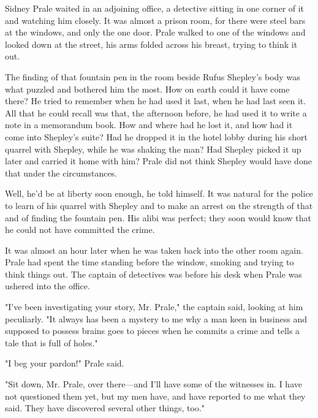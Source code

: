 \documentclass{novel}
\begin{document}
\vspace{2\nbs}
\clearpage
\thispagestyle{empty}

\begin{ChapterStart}
\vspace{3\nbs}
\end{ChapterStart}
    
Sidney Prale waited in an adjoining office, a detective sitting in one corner of it and watching him closely. It was almost a prison room, for there were steel bars at the windows, and only the one door. Prale walked to one of the windows and looked down at the street, his arms folded across his breast, trying to think it out.

The finding of that fountain pen in the room beside Rufus Shepley's body was what puzzled and bothered him the most. How on earth could it have come there? He tried to remember when he had used it last, when he had last seen it. All that he could recall was that, the afternoon before, he had used it to write a note in a memorandum book. How and where had he lost it, and how had it come into Shepley's suite? Had he dropped it in the hotel lobby during his short quarrel with Shepley, while he was shaking the man? Had Shepley picked it up later and carried it home with him? Prale did not think Shepley would have done that under the circumstances.

Well, he'd be at liberty soon enough, he told himself. It was natural for the police to learn of his quarrel with Shepley and to make an arrest on the strength of that and of finding the fountain pen. His alibi was perfect; they soon would know that he could not have committed the crime.

It was almost an hour later when he was taken back into the other room again. Prale had spent the time standing before the window, smoking and trying to think things out. The captain of detectives was before his desk when Prale was ushered into the office.

"I've been investigating your story, Mr. Prale," the captain said, looking at him peculiarly. "It always has been a mystery to me why a man keen in business and supposed to possess brains goes to pieces when he commits a crime and tells a tale that is full of holes."

"I beg your pardon!" Prale said.

"Sit down, Mr. Prale, over there---and I'll have some of the witnesses in. I have not questioned them yet, but my men have, and have reported to me what they said. They have discovered several other things, too."
\end{document}
